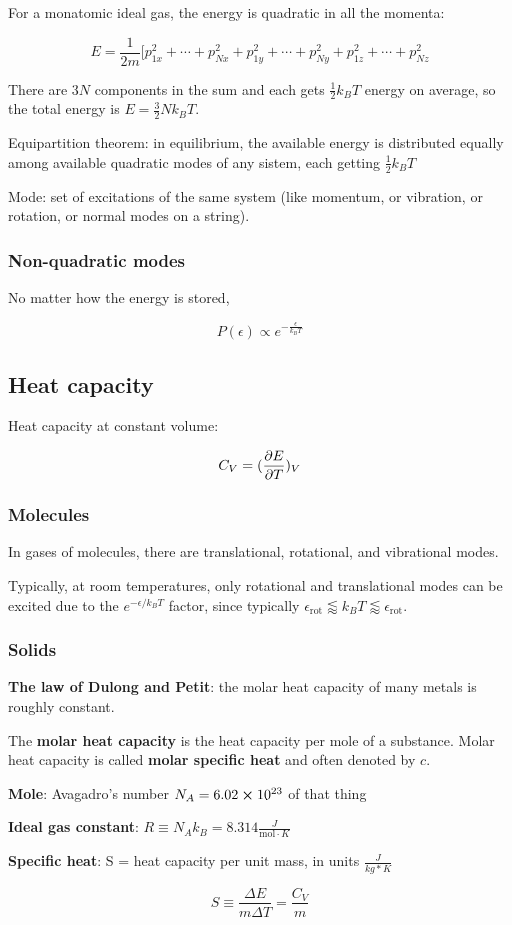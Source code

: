 For a monatomic ideal gas, the energy is quadratic in all the momenta:

$$E = \frac{1}{2m} [ p^2_{1x} + \cdots + p^2_{Nx} + p^2_{1y} + \cdots + p^2_{Ny} + p^2_{1z} + \cdots + p^2_{Nz}$$

There are $3N$ components in the sum and each gets $\frac{1}{2} k_B T$ energy on average, so the total energy is $E = \frac{3}{2} N k_B T$.

Equipartition theorem: in equilibrium, the available energy is distributed equally among available quadratic modes of any sistem, each getting $\frac{1}{2} k_B T$

Mode: set of excitations of the same system (like momentum, or vibration, or rotation, or normal modes on a string).

\subsubsection{Non-quadratic modes}

No matter how the energy is stored, 

$$P(\epsilon) \propto e^{-\frac{\epsilon}{k_B T}}$$

\subsection{Heat capacity}

Heat capacity at constant volume:

$$C_V = (\pdv{E}{T})_V$$

\subsubsection{Molecules}

In gases of molecules, there are translational, rotational, and vibrational modes. 

Typically, at room temperatures, only rotational and translational modes can be excited due to the $e^{-\epsilon/k_BT}$ factor, since typically $\epsilon_{\text{rot}} \lessapprox k_BT \lessapprox \epsilon_{\text{rot}}$.

\subsubsection{Solids}

\textbf{The law of Dulong and Petit}: the molar heat capacity of many metals is roughly constant.

The \textbf{molar heat capacity} is the heat capacity per mole of a substance. Molar heat capacity is called \textbf{molar specific heat} and often denoted by $c$.

\textbf{Mole}: Avagadro's number $N_A = 6.02 \cross 10^{23}$ of that thing

\textbf{Ideal gas constant}: $R \equiv N_A k_B = 8.314 \frac{J}{\text{mol} \cdot K}$

\textbf{Specific heat}: S = heat capacity per unit mass, in units $\frac{J}{kg * K}$

$$S \equiv \frac{\Delta E}{m \Delta T} = \frac{C_V}{m}$$